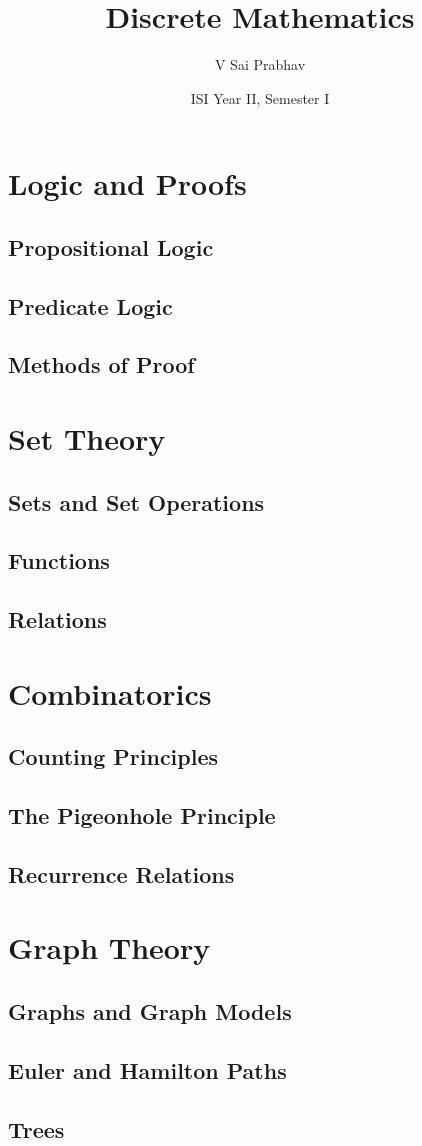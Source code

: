 \documentclass{book}
\title{Discrete Mathematics}
\author{V Sai Prabhav}
\date{ISI Year II, Semester I}
\begin{document}
\maketitle

\chapter{Logic and Proofs}
\section{Propositional Logic}
\section{Predicate Logic}
\section{Methods of Proof}

\chapter{Set Theory}
\section{Sets and Set Operations}
\section{Functions}
\section{Relations}

\chapter{Combinatorics}
\section{Counting Principles}
\section{The Pigeonhole Principle}
\section{Recurrence Relations}

\chapter{Graph Theory}
\section{Graphs and Graph Models}
\section{Euler and Hamilton Paths}
\section{Trees}

\printindex
\end{document}
